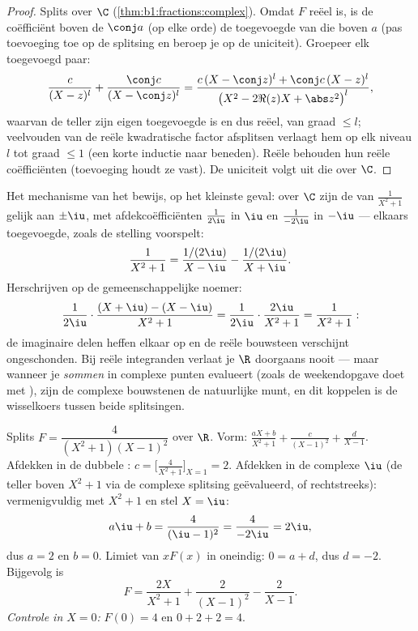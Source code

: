 \begin{proof}
Splits over $\C$ (\cref{thm:b1:fractions:complex}). Omdat $F$ reëel is,
is de coëfficiënt boven de  $\conj a$ (op elke orde) de toegevoegde
van die boven $a$ (pas toevoeging toe op de splitsing en beroep je op de
uniciteit). Groepeer elk toegevoegd paar:
\[
\frac{c}{(X - z)^l} + \frac{\conj c}{(X - \conj z)^l}
= \frac{c\,(X - \conj z)^l + \conj c\,(X - z)^l}{\bigl(X^2 - 2\Re(z)X
+ \abs z^2\bigr)^{l}},
\]
waarvan de teller zijn eigen toegevoegde is en dus reëel, van graad $\leq
l$; veelvouden van de reële kwadratische factor afsplitsen verlaagt hem op
elk niveau $l$ tot graad $\leq 1$ (een korte inductie naar beneden). Reële
 behouden hun reële coëfficiënten (toevoeging houdt ze vast). De
uniciteit volgt uit die over $\C$.
\end{proof}

\begin{example}\label{ex:b1:fractions:pairing}
Het mechanisme van het bewijs, op het kleinste geval: over $\C$ zijn de
 van $\frac1{X^2+1}$ gelijk aan $\pm\iu$, met afdekcoëfficiënten
$\frac1{2\iu}$ in $\iu$ en $\frac1{-2\iu}$ in $-\iu$ --- elkaars
toegevoegde, zoals de stelling voorspelt:
\[
\frac{1}{X^2 + 1}
= \frac{1/(2\iu)}{X - \iu} - \frac{1/(2\iu)}{X + \iu} .
\]
Herschrijven op de gemeenschappelijke noemer:
\[
\frac{1}{2\iu}\cdot\frac{(X + \iu) - (X - \iu)}{X^2 + 1}
= \frac{1}{2\iu}\cdot\frac{2\iu}{X^2 + 1} = \frac{1}{X^2+1} :
\]
de imaginaire delen heffen elkaar op en de reële bouwsteen verschijnt
ongeschonden. Bij reële integranden verlaat je $\R$ doorgaans nooit ---
maar wanneer je \emph{sommen} in complexe punten evalueert (zoals de
weekendopgave doet met ), zijn de complexe bouwstenen de
natuurlijke munt, en dit koppelen is de wisselkoers tussen beide
splitsingen.
\end{example}

\begin{example}\label{ex:b1:fractions:real}
Splits $F = \dfrac{4}{(X^2+1)(X-1)^2}$ over $\R$. Vorm: $\frac{aX +
b}{X^2 + 1} + \frac{c}{(X-1)^2} + \frac{d}{X - 1}$. Afdekken in de
dubbele : $c = \bigl[\frac{4}{X^2+1}\bigr]_{X=1} = 2$. Afdekken in de
complexe  $\iu$ (de teller boven $X^2 + 1$ via de complexe splitsing
geëvalueerd, of rechtstreeks): vermenigvuldig met $X^2 + 1$ en stel $X =
\iu$:
\[
a\iu + b = \frac{4}{(\iu - 1)^2} = \frac{4}{-2\iu} = 2\iu ,
\]
dus $a = 2$ en $b = 0$. Limiet van $xF(x)$ in oneindig: $0 = a + d$, dus
$d = -2$. Bijgevolg is
\[
F = \frac{2X}{X^2+1} + \frac{2}{(X-1)^2} - \frac{2}{X-1} .
\]
\emph{Controle in $X = 0$:} $F(0) = 4$ en $0 + 2 + 2 = 4$.
\end{example}

